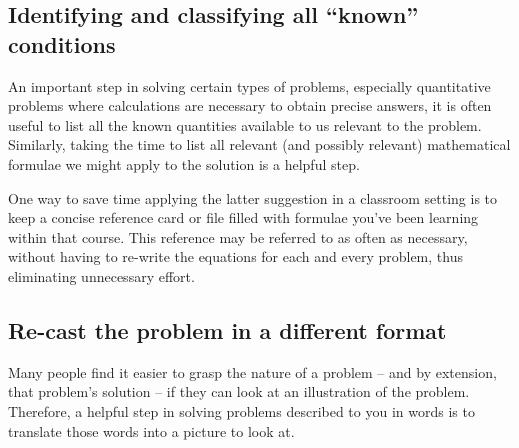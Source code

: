 \filbreak
\subsection{Identifying and classifying all ``known'' conditions}

An important step in solving certain types of problems, especially quantitative problems where calculations are necessary to obtain precise answers, it is often useful to list all the known quantities available to us relevant to the problem.  Similarly, taking the time to list all relevant (and possibly relevant) mathematical formulae we might apply to the solution is a helpful step.  

One way to save time applying the latter suggestion in a classroom setting is to keep a concise reference card or file filled with formulae you've been learning within that course.  This reference may be referred to as often as necessary, without having to re-write the equations for each and every problem, thus eliminating unnecessary effort.
















\filbreak
\subsection{Re-cast the problem in a different format}

Many people find it easier to grasp the nature of a problem -- and by extension, that problem's solution -- if they can look at an illustration of the problem.  Therefore, a helpful step in solving problems described to you in words is to translate those words into a picture to look at.  

